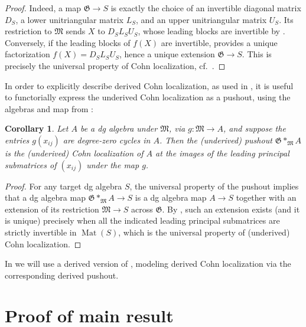 \documentclass[11pt]{article}
\newtheorem{corollary}[theorem]{Corollary}
\newcommand{\FM}{\mathfrak M}
\newcommand{\FG}{\mathfrak G}
\newcommand{\lr}{\longrightarrow}
\newcommand{\Mat}{\operatorname{Mat}}
\begin{document}
\begin{proof}
Indeed, a map \(\FG\to S\) is exactly the choice of an invertible diagonal
matrix \(D_S\), a lower unitriangular matrix \(L_S\), and an upper
unitriangular matrix \(U_S\).  Its restriction to \(\FM\) sends \(X\)
to \(D_SL_SU_S\), whose leading blocks are invertible by .
Conversely, if the leading blocks of \(f(X)\) are invertible, 
provides a unique factorization \(f(X)=D_SL_SU_S\), hence a unique
extension \(\FG\to S\).  This is precisely the universal property
of Cohn localization, cf.~\cite[Chapter 7]{CohnBook}.
\end{proof}

In order to explicitly describe derived Cohn localization, as used in , it is useful to functorially express the underived Cohn localization as a pushout, using the algebras and map from :

\begin{corollary}
\label{cor:strict-base-change}
Let \(A\) be a dg algebra under \(\FM\), via $g:\FM\lr A$, and suppose the entries $g(x_{ij})$ are degree-zero cycles in $A$.  Then the (underived) pushout $ \FG*_{\FM}A$ is the (underived) Cohn localization of \(A\) at the images of the leading principal submatrices of $(x_{ij})$ under the map $g$.
\end{corollary}

\begin{proof}
For any target dg algebra \(S\), the universal property of the pushout implies that a dg algebra map \(\FG*_{\FM}A\lr S\) is a dg algebra map \(A\lr S\)
together with an extension of its restriction \(\FM	\lr S\) across
\(\FG\).  By , such an extension
exists (and it is unique) precisely when all the indicated leading principal submatrices
are strictly invertible in \(\Mat(S)\), which is the universal property of (underived) Cohn
localization.
\end{proof}
\color{black}
In  we will use a derived version of , modeling derived Cohn localization via the corresponding derived pushout.
\section{Proof of main result}\label{sec:main_proof}
\end{document}
